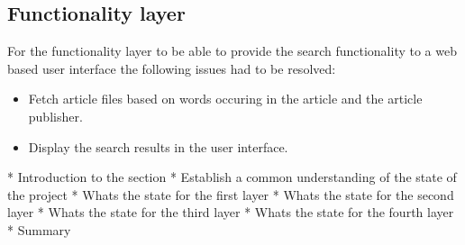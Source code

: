\subsection*{Functionality layer}
For the functionality layer to be able to provide the search functionality to a web based user interface the following issues had to be resolved:
\begin{itemize}
    \item Fetch article files based on words occuring in the article and the article publisher.
    \item Display the search results in the user interface.
\end{itemize}

* Introduction to the section
    * Establish a common understanding of the state of the project
* Whats the state for the first layer
* Whats the state for the second layer
* Whats the state for the third layer
* Whats the state for the fourth layer
* Summary